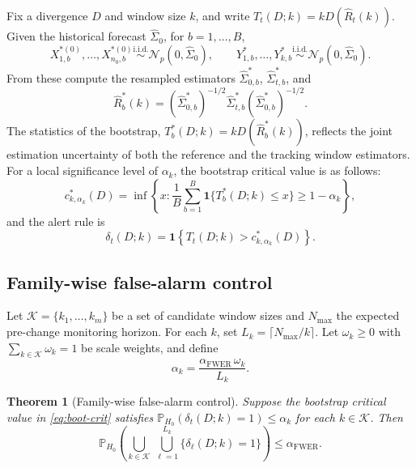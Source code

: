 \documentclass[11pt,a4paper]{article}
\newtheorem{theorem}{Theorem}
\newcommand{\Prob}{\mathbb{P}}
\newcommand{\one}{\mathbf{1}}
\newcommand{\calN}{\mathcal{N}}
\begin{document}
Fix a divergence $D$ and window size $k$, and write $T_{t}(D;k)=kD(\widehat{R}_{t}(k))$.
Given the historical forecast $\widehat{\Sigma}_{0}$,
for $b = 1, \ldots, B$,
\[
X_{1,b}^{*(0)}, \ldots, X_{n_{0},b}^{*(0)}
\stackrel{\mathrm{i.i.d.}}{\sim}
\calN_{p}(0,\widehat{\Sigma}_{0}),
\qquad
Y_{1,b}^{*},\ldots,Y_{k,b}^{*}
\stackrel{\mathrm{i.i.d.}}{\sim}
\calN_{p}(0,\widehat{\Sigma}_{0}).
\]
From these compute the resampled estimators $\widehat{\Sigma}_{0,b}^{*}$,
$\widehat{\Sigma}_{t,b}^{*}$, and
\[
\widehat{R}_{b}^{*}(k)
= \left(\widehat{\Sigma}_{0,b}^{*}\right)^{-1/2}
  \widehat{\Sigma}_{t,b}^{*}
  \left(\widehat{\Sigma}_{0,b}^{*}\right)^{-1/2}.
\]
The statistics of the bootstrap, $T_{b}^{*}(D;k)=kD(\widehat{R}_{b}^{*}(k))$,
reflects the joint estimation uncertainty of both the
reference and the tracking window estimators. For a local significance level of $\alpha_{k}$,
the bootstrap critical value is as follows:
\begin{equation}
c_{k,\alpha_{k}}^{*}(D)
= \inf\!\left\{x:\frac{1}{B}\sum_{b=1}^{B}\one\bigl\{T_{b}^{*}(D;k)\leq x\bigr\}
  \geq 1-\alpha_{k}\right\},
\label{eq:boot-crit}
\end{equation}
and the alert rule is
\begin{equation}
\delta_{t}(D;k) = \one\!\left\{T_{t}(D;k)>c_{k,\alpha_{k}}^{*}(D)\right\}.
\label{eq:alert}
\end{equation}

\subsection{Family-wise false-alarm control}

Let $\mathcal{K}=\{k_{1},\ldots,k_{m}\}$ be a set of candidate window sizes
and $N_{\max}$ the expected pre-change monitoring horizon.  For each $k$,
set $L_{k}=\lceil N_{\max}/k\rceil$.  Let $\omega_{k}\geq 0$ with
$\sum_{k\in\mathcal{K}}\omega_{k}=1$ be scale weights, and define
\begin{equation}
\alpha_{k} = \frac{\alpha_{\mathrm{FWER}}\,\omega_{k}}{L_{k}}.
\label{eq:alpha-k}
\end{equation}

\begin{theorem}[Family-wise false-alarm control]
\label{thm:fwer}
Suppose the bootstrap critical value in \eqref{eq:boot-crit} satisfies
$\Prob_{H_{0}}(\delta_{t}(D;k)=1)\leq\alpha_{k}$ for each $k\in\mathcal{K}$.
Then
\[
\Prob_{H_{0}}\!\left(
\bigcup_{k\in\mathcal{K}}\,\bigcup_{\ell=1}^{L_{k}}\{\delta_{\ell}(D;k)=1\}
\right) \leq \alpha_{\mathrm{FWER}}.
\]
\end{theorem}
\end{document}
